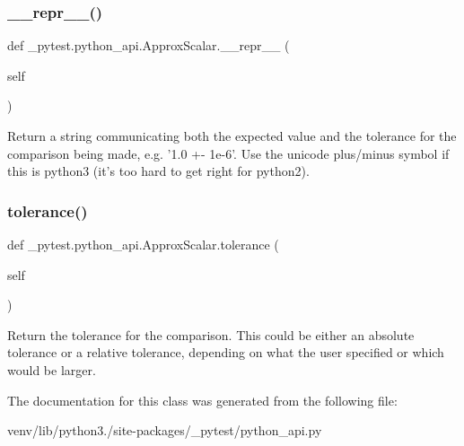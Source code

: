 \subsubsection{\texorpdfstring{\+\_\+\+\_\+repr\+\_\+\+\_\+()}{\_\_repr\_\_()}}
{\footnotesize\ttfamily def \+\_\+pytest.\+python\+\_\+api.\+Approx\+Scalar.\+\_\+\+\_\+repr\+\_\+\+\_\+ (\begin{DoxyParamCaption}\item[{}]{self }\end{DoxyParamCaption})}

\begin{DoxyVerb}Return a string communicating both the expected value and the tolerance
for the comparison being made, e.g. '1.0 +- 1e-6'.  Use the unicode
plus/minus symbol if this is python3 (it's too hard to get right for
python2).
\end{DoxyVerb}
 \mbox{\label{class__pytest_1_1python__api_1_1_approx_scalar_ad3d6c645f7988064aaf458340d8e1dca}} 
\subsubsection{\texorpdfstring{tolerance()}{tolerance()}}
{\footnotesize\ttfamily def \+\_\+pytest.\+python\+\_\+api.\+Approx\+Scalar.\+tolerance (\begin{DoxyParamCaption}\item[{}]{self }\end{DoxyParamCaption})}

\begin{DoxyVerb}Return the tolerance for the comparison.  This could be either an
absolute tolerance or a relative tolerance, depending on what the user
specified or which would be larger.
\end{DoxyVerb}
 

The documentation for this class was generated from the following file\+:\begin{DoxyCompactItemize}
\item 
venv/lib/python3./site-\/packages/\+\_\+pytest/python\+\_\+api.\+py\end{DoxyCompactItemize}
